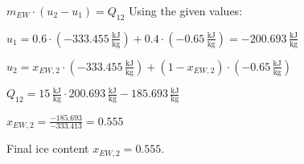 \( m_{EW} \cdot (u_2 - u_1) = Q_{12} \)  
Using the given values:  

\( u_1 = 0.6 \cdot (-333.455 \, \frac{\text{kJ}}{\text{kg}}) + 0.4 \cdot (-0.65 \, \frac{\text{kJ}}{\text{kg}}) = -200.693 \, \frac{\text{kJ}}{\text{kg}} \)  

\( u_2 = x_{EW,2} \cdot (-333.455 \, \frac{\text{kJ}}{\text{kg}}) + (1 - x_{EW,2}) \cdot (-0.65 \, \frac{\text{kJ}}{\text{kg}}) \)  

\( Q_{12} = 15 \, \frac{\text{kJ}}{\text{kg}} \cdot 200.693 \, \frac{\text{kJ}}{\text{kg}} - 185.693 \, \frac{\text{kJ}}{\text{kg}} \)  

\( x_{EW,2} = \frac{-185.693}{-333.413} = 0.555 \)  

Final ice content \( x_{EW,2} = 0.555 \).